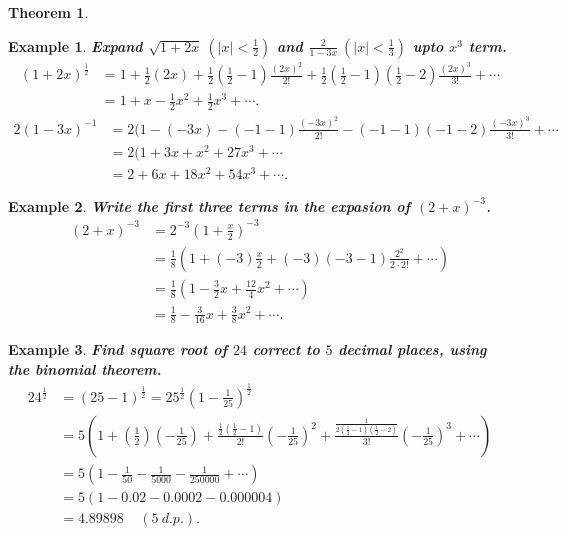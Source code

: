 \documentclass[12pt, a4paper]{article}
\newtheorem{theorem}{Theorem}[subsection]
\newtheorem{example}{Example}[subsection]
\begin{document}
\begin{enumerate}
\begin{theorem}
  \end{theorem}
  \begin{example}
    \textbf{Expand $\sqrt{1+2x}\ \left(\left|x\right|<\frac{1}{2}\right)$ and $\frac{2}{1-3x}\ \left(\left|x\right|<\frac{1}{3}\right)$ upto $x^3$ term.}
    $$\begin{aligned}
      (1+2x)^\frac{1}{2}&=1+\frac{1}{2}(2x)+\frac{1}{2}\left(\frac{1}{2}-1\right)\frac{(2x)^2}{2!}+\frac{1}{2}\left(\frac{1}{2}-1\right)\left(\frac{1}{2}-2\right)\frac{(2x)^3}{3!}+\cdots\\
      &=1+x-\frac{1}{2}x^2+\frac{1}{2}x^3+\cdots.
    \end{aligned}$$
    $$\begin{aligned}
      2(1-3x)^{-1}&=2(1-(-3x)-\left(-1-1\right)\frac{(-3x)^2}{2!}-\left(-1-1\right)\left(-1-2\right)\frac{(-3x)^3}{3!}+\cdots\\
      &=2(1+3x+x^2+27x^3+\cdots\\
      &=2+6x+18x^2+54x^3+\cdots.
    \end{aligned}$$
  \end{example}
  \begin{example}
    \textbf{Write the first three terms in the expasion of $(2+x)^{-3}$.}
    $$\begin{aligned}
      (2+x)^{-3}&=2^{-3}\left(1+\frac{x}{2}\right)^{-3}\\
      &=\frac{1}{8}\left(1+(-3)\frac{x}{2}+(-3)(-3-1)\frac{2^2}{2\cdot 2!}+\cdots\right)\\
      &=\frac{1}{8}\left(1-\frac{3}{2}x+\frac{12}{4}x^2+\cdots\right)\\
      &=\frac{1}{8}-\frac{3}{16}x+\frac{3}{8}x^2+\cdots.
    \end{aligned}$$
  \end{example}
  \begin{example}
    \textbf{Find square root of $24$ correct to $5$ decimal places, using the binomial theorem.}
    $$\begin{aligned}
      24^\frac{1}{2}&=(25-1)^\frac{1}{2}=25^\frac{1}{2}\left(1-\frac{1}{25}\right)^\frac{1}{2}\\
      &=5\left(1+\left(\frac{1}{2}\right)\left(-\frac{1}{25}\right)+\frac{\frac{1}{2}\left(\frac{1}{2}-1\right)}{2!}\left(-\frac{1}{25}\right)^2+\frac{\frac{1}{2\left(\frac{1}{2}-1\right)\left(\frac{1}{2}-2\right)}}{3!}\left(-\frac{1}{25}\right)^3+\cdots\right)\\
      &=5\left(1-\frac{1}{50}-\frac{1}{5000}-\frac{1}{250000}+\cdots\right)\\
      &=5(1-0.02-0.0002-0.000004)\\
      &=4.89898 \ \ \ \ \ (5\ d.p.). 
    \end{aligned}$$
  \end{example}
\end{enumerate}
\end{document}
